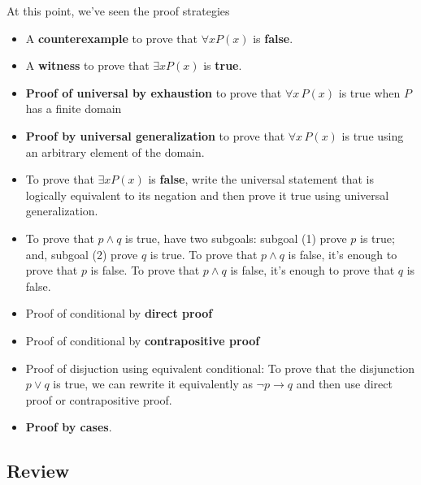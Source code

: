 \documentclass[12pt, oneside]{article}
\begin{document}
At this point, we've seen the proof strategies
\begin{multicols}{2}
    \begin{itemize}
        \item A {\bf counterexample} to prove that  $\forall x P(x)$ is {\bf false}.
        \item  A {\bf witness} to prove that  $\exists x P(x)$ is {\bf true}.
        \item {\bf Proof of universal by exhaustion} to prove that $\forall x \, P(x)$
    is true when $P$ has a finite domain
        \item  {\bf Proof by universal generalization} to prove that $\forall x \, P(x)$
    is true using an arbitrary element of the domain.
        \item To  prove  that $\exists x P(x)$ is {\bf false}, write the universal statement that is 
        logically equivalent to its negation and then prove it true using universal generalization.
        \item To prove that $p \land q$ is true, have two subgoals: 
        subgoal (1) prove $p$ is  true; and, subgoal (2) prove $q$ is true. To prove that $p \land q$ is false, it's enough to prove that $p$ is false.
     To prove that $p \land q$ is false, it's enough to prove that $q$ is false.
        \item Proof of conditional by {\bf direct proof}
        \item Proof of conditional by {\bf contrapositive proof}
        \item Proof of disjuction using equivalent conditional: To prove that the 
        disjunction $p \lor q$ is true, we can rewrite it equivalently as $\lnot p \to q$ and
        then use direct proof or contrapositive proof.
        \item {\bf Proof by cases}.
    \end{itemize}
\end{multicols}
\newpage

\newpage


\newpage

\newpage
\subsection*{Review}

\end{document}
